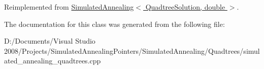 Reimplemented from \hyperlink{class_simulated_annealing_a52fd0bfedf6b9102adaba0ad494c8d54}{SimulatedAnnealing$<$ QuadtreeSolution, double $>$}.

The documentation for this class was generated from the following file:\begin{DoxyCompactItemize}
\item 
D:/Documents/Visual Studio 2008/Projects/SimulatedAnnealingPointers/SimulatedAnnealing/Quadtrees/simulated\_\-annealing\_\-quadtrees.cpp\end{DoxyCompactItemize}
